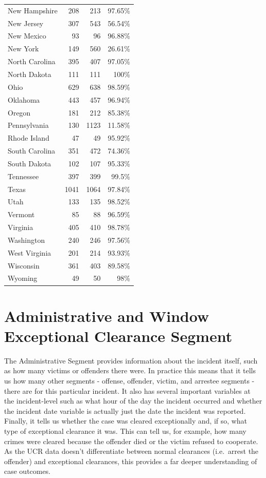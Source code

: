 \documentclass[
  12pt,
  openany]{book}
\begin{document}
\begin{longtable}[t]{lrrr}
\addlinespace
New Hampshire & 208 & 213 & 97.65\%\\
New Jersey & 307 & 543 & 56.54\%\\
New Mexico & 93 & 96 & 96.88\%\\
New York & 149 & 560 & 26.61\%\\
North Carolina & 395 & 407 & 97.05\%\\
\addlinespace
North Dakota & 111 & 111 & 100\%\\
Ohio & 629 & 638 & 98.59\%\\
Oklahoma & 443 & 457 & 96.94\%\\
Oregon & 181 & 212 & 85.38\%\\
Pennsylvania & 130 & 1123 & 11.58\%\\
\addlinespace
Rhode Island & 47 & 49 & 95.92\%\\
South Carolina & 351 & 472 & 74.36\%\\
South Dakota & 102 & 107 & 95.33\%\\
Tennessee & 397 & 399 & 99.5\%\\
Texas & 1041 & 1064 & 97.84\%\\
\addlinespace
Utah & 133 & 135 & 98.52\%\\
Vermont & 85 & 88 & 96.59\%\\
Virginia & 405 & 410 & 98.78\%\\
Washington & 240 & 246 & 97.56\%\\
West Virginia & 201 & 214 & 93.93\%\\
\addlinespace
Wisconsin & 361 & 403 & 89.58\%\\
Wyoming & 49 & 50 & 98\%\\
\bottomrule
\end{longtable}

\chapter{Administrative and Window Exceptional Clearance Segment}\label{administrative-and-window-exceptional-clearance-segment}

The Administrative Segment provides information about the incident itself, such as how many victims or offenders there were. In practice this means that it tells us how many other segments - offense, offender, victim, and arrestee segments - there are for this particular incident. It also has several important variables at the incident-level such as what hour of the day the incident occurred and whether the incident date variable is actually just the date the incident was reported. Finally, it tells us whether the case was cleared exceptionally and, if so, what type of exceptional clearance it was. This can tell us, for example, how many crimes were cleared because the offender died or the victim refused to cooperate. As the UCR data doesn't differentiate between normal clearances (i.e.~arrest the offender) and exceptional clearances, this provides a far deeper understanding of case outcomes.
\end{document}
